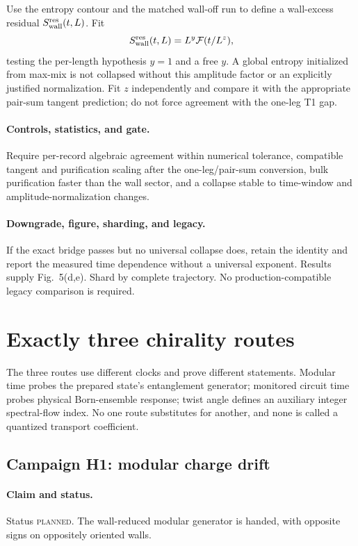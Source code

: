 \documentclass[aps,prx,onecolumn,nofootinbib,superscriptaddress,longbibliography]{revtex4-2}
\newcommand{\mc}[1]{\mathcal{#1}}
\newcommand{\planned}{\textsc{planned}}
\begin{document}
Use the entropy contour and the matched wall-off run to define a wall-excess residual
$S_{\rm wall}^{\rm res}(t,L)$.  Fit
\begin{equation}
 S_{\rm wall}^{\rm res}(t,L)=L^y\mc F(t/L^z),
 \label{eq:purification-collapse}
\end{equation}
testing the per-length hypothesis $y=1$ and a free $y$.  A global entropy initialized from
max-mix is not collapsed without this amplitude factor or an explicitly justified
normalization.  Fit $z$ independently and compare it with the appropriate pair-sum tangent
prediction; do not force agreement with the one-leg T1 gap.

\paragraph{Controls, statistics, and gate.}
Require per-record algebraic agreement within numerical tolerance, compatible tangent and
purification scaling after the one-leg/pair-sum conversion, bulk purification faster than
the wall sector, and a collapse stable to time-window and amplitude-normalization changes.

\paragraph{Downgrade, figure, sharding, and legacy.}
If the exact bridge passes but no universal collapse does, retain the identity and report
the measured time dependence without a universal exponent.  Results supply Fig.~5(d,e).
Shard by complete trajectory.  No production-compatible legacy comparison is required.

\section{Exactly three chirality routes}

The three routes use different clocks and prove different statements.  Modular time probes
the prepared state's entanglement generator; monitored circuit time probes physical
Born-ensemble response; twist angle defines an auxiliary integer spectral-flow index.  No
one route substitutes for another, and none is called a quantized transport coefficient.

\subsection{Campaign H1: modular charge drift}
\paragraph{Claim and status.}
Status \planned.  The wall-reduced modular generator is handed, with opposite signs on
oppositely oriented walls.
\end{document}
